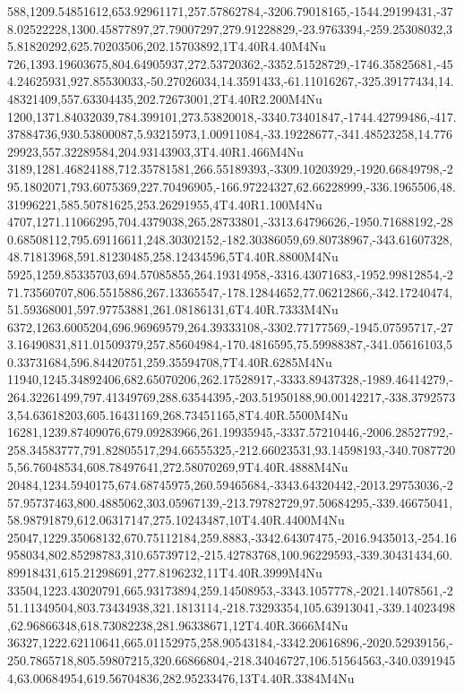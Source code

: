 588,1209.54851612,653.92961171,257.57862784,-3206.79018165,-1544.29199431,-378.02522228,1300.45877897,27.79007297,279.91228829,-23.9763394,-259.25308032,35.81820292,625.70203506,202.15703892,1T4.40R4.40M4Nu
726,1393.19603675,804.64905937,272.53720362,-3352.51528729,-1746.35825681,-454.24625931,927.85530033,-50.27026034,14.3591433,-61.11016267,-325.39177434,14.48321409,557.63304435,202.72673001,2T4.40R2.200M4Nu
1200,1371.84032039,784.399101,273.53820018,-3340.73401847,-1744.42799486,-417.37884736,930.53800087,5.93215973,1.00911084,-33.19228677,-341.48523258,14.77629923,557.32289584,204.93143903,3T4.40R1.466M4Nu
3189,1281.46824188,712.35781581,266.55189393,-3309.10203929,-1920.66849798,-295.1802071,793.6075369,227.70496905,-166.97224327,62.66228999,-336.1965506,48.31996221,585.50781625,253.26291955,4T4.40R1.100M4Nu
4707,1271.11066295,704.4379038,265.28733801,-3313.64796626,-1950.71688192,-280.68508112,795.69116611,248.30302152,-182.30386059,69.80738967,-343.61607328,48.71813968,591.81230485,258.12434596,5T4.40R.8800M4Nu
5925,1259.85335703,694.57085855,264.19314958,-3316.43071683,-1952.99812854,-271.73560707,806.5515886,267.13365547,-178.12844652,77.06212866,-342.17240474,51.59368001,597.97753881,261.08186131,6T4.40R.7333M4Nu
6372,1263.6005204,696.96969579,264.39333108,-3302.77177569,-1945.07595717,-273.16490831,811.01509379,257.85604984,-170.4816595,75.59988387,-341.05616103,50.33731684,596.84420751,259.35594708,7T4.40R.6285M4Nu
11940,1245.34892406,682.65070206,262.17528917,-3333.89437328,-1989.46414279,-264.32261499,797.41349769,288.63544395,-203.51950188,90.00142217,-338.37925733,54.63618203,605.16431169,268.73451165,8T4.40R.5500M4Nu
16281,1239.87409076,679.09283966,261.19935945,-3337.57210446,-2006.28527792,-258.34583777,791.82805517,294.66555325,-212.66023531,93.14598193,-340.70877205,56.76048534,608.78497641,272.58070269,9T4.40R.4888M4Nu
20484,1234.5940175,674.68745975,260.59465684,-3343.64320442,-2013.29753036,-257.95737463,800.4885062,303.05967139,-213.79782729,97.50684295,-339.46675041,58.98791879,612.06317147,275.10243487,10T4.40R.4400M4Nu
25047,1229.35068132,670.75112184,259.8883,-3342.64307475,-2016.9435013,-254.16958034,802.85298783,310.65739712,-215.42783768,100.96229593,-339.30431434,60.89918431,615.21298691,277.8196232,11T4.40R.3999M4Nu
33504,1223.43020791,665.93173894,259.14508953,-3343.1057778,-2021.14078561,-251.11349504,803.73434938,321.1813114,-218.73293354,105.63913041,-339.14023498,62.96866348,618.73082238,281.96338671,12T4.40R.3666M4Nu
36327,1222.62110641,665.01152975,258.90543184,-3342.20616896,-2020.52939156,-250.7865718,805.59807215,320.66866804,-218.34046727,106.51564563,-340.03919454,63.00684954,619.56704836,282.95233476,13T4.40R.3384M4Nu

